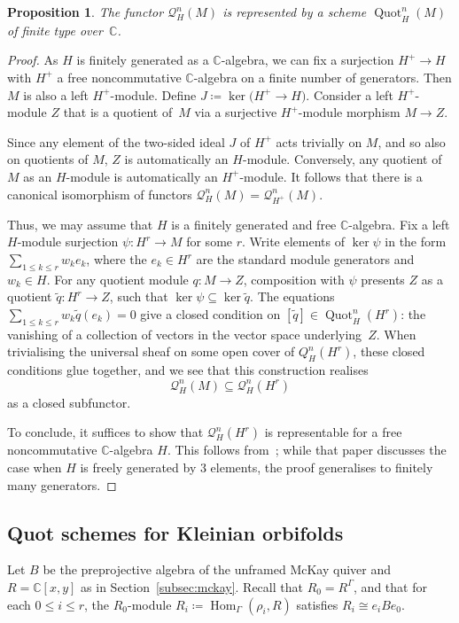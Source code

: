 \documentclass[10pt,a4paper]{amsart}
\newtheorem{Proposition}[Theorem]{Proposition}
 { \theoremstyle{definition}
\newtheorem{Definition}[Theorem]{Definition}
\newtheorem{Example}[Theorem]{Example}
\newtheorem{Remark}[Theorem]{Remark}
\newtheorem{remarks}[theorem]{Remarks}
}
\newcommand{\SC}{\mathbb{C}} %
\newcommand{\C}{\SC} %
\newcommand{\Hom}{\operatorname{Hom}}
\newcommand{\PiGamma}{B}
\DeclareMathOperator{\Quot}{\mathrm{Quot}}
\numberwithin{equation}{section}
\begin{document}
\begin{Proposition}
\label{prop:Qnrep}
The functor $\mathcal{Q}^{n}_H(M)$ is represented by a scheme $\Quot^{n}_H(M)$
of finite type over~$\SC$.
\end{Proposition}
\begin{proof}
As $H$ is finitely generated as a $\SC$-algebra, we can fix a surjection $H^+\to H$ with $H^+$ a free noncommutative $\SC$-algebra on a finite number of generators.
Then $M$ is also a left $H^+$-module. Define $J\coloneqq \ker\big(H^+ \to H\big)$. Consider a left $H^+$-module $Z$ that is a quotient of~$M$ via a surjective $H^+$-module morphism $M \to Z$.

Since any element of the two-sided ideal $J$ of $H^+$ acts trivially on $M$, and so also on quotients of $M$, $Z$ is automatically an $H$-module. Conversely, any quotient of $M$ as an $H$-module is automatically an $H^{+}$-module. It follows that there is a canonical isomorphism of functors $\mathcal{Q}^n_H(M) = \mathcal Q^n_{H^+}(M)$.

Thus, we may assume that $H$ is a finitely generated and free $\C$-algebra.
Fix a left $H$-module surjection $\psi\colon H^r \to M$ for some $r$.
 Write elements of $\ker \psi$ in the form $\sum_{1\leq k \leq r} w_{k} e_k $, where the $e_k \in H^r$ are the standard module generators and $w_k \in H$.
 For any quotient module $q\colon M \to Z$, composition with $\psi$ presents $Z$ as a quotient $\tilde q\colon H^r \to Z$,
 such that $\ker \psi\subseteq\ker\tilde q$.
 The equations $\sum_{1\leq k \leq r} w_{k} \tilde q(e_k)=0$ give
 a closed condition on $[\tilde q]\in \Quot^n_H(H^r)$: the vanishing of a collection of vectors in the vector space underlying~$Z$.
 When trivialising the universal sheaf on some open cover of $Q^n_H(H^r)$, these closed conditions glue together, and
 we see that this construction realises
\[\mathcal{Q}^n_H(M) \subseteq \mathcal{Q}^n_H(H^r)\]
as a closed subfunctor.

To conclude, it suffices to show that $\mathcal{Q}^n_H(H^r)$ is representable for a free noncommutative $\SC$-algebra $H$. This follows from~\cite[Theorem 2.5]{beentjes2018virtual}; while that paper discusses the case when $H$ is freely generated by $3$ elements, the proof generalises to finitely many generators.
\end{proof}


\subsection{Quot schemes for Kleinian orbifolds}
\label{subsec:Quotorbi}
Let $\PiGamma$ be the preprojective algebra of the unframed McKay quiver and $R=\SC[x,y]$ as
in Section~\ref{subsec:mckay}.
Recall that $R_0=R^\Gamma$, and that for each $0\leq i \leq r$, the
$R_0$-module $R_i\coloneqq\Hom_\Gamma(\rho_i,R)$ satisfies $R_i\cong e_iBe_0$.
\end{document}
